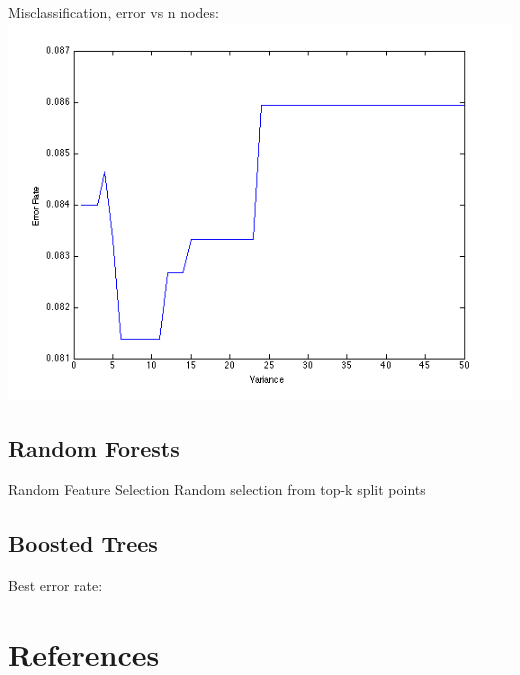 \documentclass[11pt,a4paper]{article}
\begin{document}
Misclassification, error vs n nodes:\\
\includegraphics[width=\textwidth]{decision_tree_misclassification_error_vs_n_nodes.png}

\subsection{Random Forests}
Random Feature Selection
Random selection from top-k split points

\subsection{Boosted Trees}
Best error rate: 

\section{References}
\end{document}

